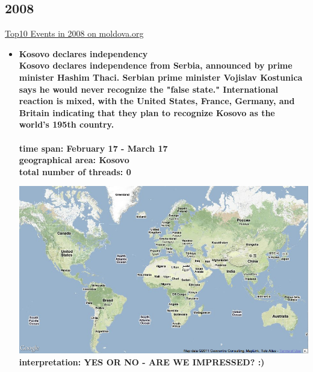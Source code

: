 \documentclass[11pt,a4paper,english]{article}
\begin{document}
\begin{itemize}
						
						
				\end{itemize}
			
			\subsection{2008}
			\href{http://social.moldova.org/news/10-most-important-world-events-of-2008-217389-eng.html}{Top10 Events in 2008 on moldova.org}
				\begin{itemize}
					\item \bf Kosovo declares independency \rm
						\\ Kosovo declares independence from Serbia, announced by prime minister Hashim Thaci. Serbian prime minister Vojislav Kostunica says he would never recognize the "false state." International reaction is mixed, with the United States, France, Germany, and Britain indicating that they plan to recognize Kosovo as the world's 195th country.
						\\\\ \bf time span: \rm February 17 - March 17
						\\ \bf geographical area: \rm Kosovo
						\\ \bf total number of threads: \rm 0
					
						\includegraphics[width=130mm]{img/2005-1}
						\bf interpretation: \rm YES OR NO - ARE WE IMPRESSED? :)
						
						
						

\end{itemize}
\end{document}
